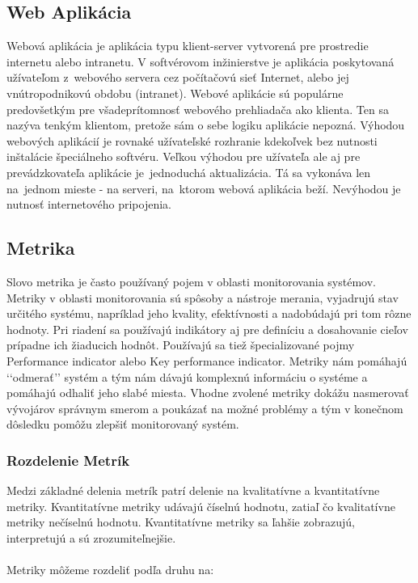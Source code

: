 \documentclass[a4paper, usesections, upjsfrontpage, thesismargins, thesislinespacing, twoside]{rnthesissvk}
\begin{document}
\subsection{Web Aplikácia}

Webová aplikácia je aplikácia typu klient-server vytvorená pre prostredie internetu alebo intranetu.
V softvérovom inžinierstve je aplikácia poskytovaná užívateľom z~webového servera cez počítačovú sieť Internet, 
alebo jej vnútropodni\-kovú obdobu (intranet). 
Webové aplikácie sú populárne predovšetkým pre všade\-prítomnosť webového prehliadača ako klienta. 
Ten sa nazýva tenkým klientom, pretože sám o sebe logiku aplikácie nepozná.
Výhodou webových aplikácií je rovnaké užívateľské rozhranie kdekoľvek bez nutnosti inštalácie špeciálneho softvéru. 
Veľkou výhodou pre užívateľa ale aj pre prevádzkovateľa aplikácie je~jednoduchá aktualizácia. 
Tá sa vykonáva len na~jednom mieste - na serveri, na~ktorom webová aplikácia beží. Nevýhodou je nutnosť internetového pripojenia.

\subsection{Metrika}
Slovo metrika je často používaný pojem v oblasti monitorovania systémov.
Metri\-ky v oblasti monitorovania sú spôsoby a nástroje merania, vyjadrujú stav určitého systému, 
napríklad jeho kvality, efektívnosti a nadobúdajú pri tom rôzne hodnoty. 
Pri riadení sa používajú indikátory aj pre definíciu a dosahovanie cieľov prípadne ich žiaducich hodnôt. 
Používajú sa tiež špecializované pojmy Performance indicator alebo Key performance indicator.
Metriky nám pomáhajú ‘‘odmerať’’ systém a tým nám dávajú komplexnú informáciu o systéme a pomáhajú odhaliť jeho slabé miesta.
Vhodne zvolené metriky dokážu nasmerovať vývojárov správnym smerom a poukázať na možné problémy a tým v konečnom dôsledku pomôžu zlepšiť monitorovaný systém.

\subsubsection{Rozdelenie Metrík}


Medzi základné delenia metrík patrí delenie na kvalitatívne a kvantitatívne metriky.
Kvantitatívne metriky udávajú číselnú hodnotu, zatiaľ čo kvalitatívne metriky nečíselnú hodnotu.  
Kvantitatívne metriky sa ľahšie zobrazujú, interpretujú a sú zrozumiteľnejšie.
~\\
~\\
Metriky môžeme rozdeliť podľa druhu na:
\end{document}
